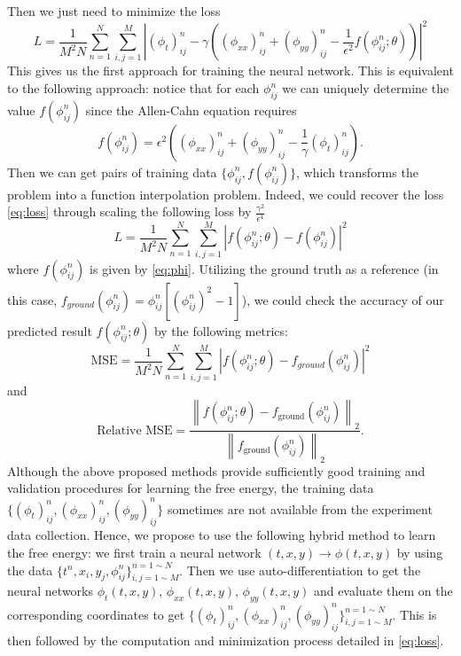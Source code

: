 Then we just need to minimize the loss 
\begin{equation}
    L = \frac{1}{M^{2}N} \sum^{N}_{n=1} \sum^{M}_{i, j=1} |(\phi_{t})^{n}_{ij} - \gamma ( (\phi_{xx})^{n}_{ij} + (\phi_{yy})^{n}_{ij} - \frac{1}{\epsilon^2} f( \phi^{n}_{ij};\theta ) )|^2
\label{eq:loss}
\end{equation}  
This gives us the first approach for training the neural network. This is equivalent to the following approach: notice that for each $\phi^{n}_{ij}$ we can uniquely determine the value $f( \phi^{n}_{ij} )$ since the Allen-Cahn equation requires
\begin{equation}
f( \phi^{n}_{ij} ) = \epsilon^2 ((\phi_{xx})^{n}_{ij} + (\phi_{yy})^{n}_{ij} - \frac{1}{\gamma} (\phi_t)^{n}_{ij} ).
\label{eq:phi}
\end{equation}
Then we can get pairs of training data $\{ \phi^{n}_{ij}, f( \phi^{n}_{ij} ) \}$, which transforms the problem into a function interpolation problem. Indeed, we could recover the loss \cref{eq:loss} through scaling the following loss by $\frac{\gamma^2}{\epsilon^4}$
\begin{equation}
    L = \frac{1}{M^{2}N} \sum^{N}_{n=1} \sum^{M}_{i, j=1} |f( \phi^{n}_{ij};\theta ) - f( \phi^{n}_{ij} )|^2
\label{eq:l}
\end{equation}
where $f( \phi^{n}_{ij} )$ is given by \eqref{eq:phi}. Utilizing the ground truth as a reference (in this case, \( f_{ground}( \phi^{n}_{ij} ) =  \phi^{n}_{ij} [(\phi^{n}_{ij})^{2} - 1] \)), we could check the accuracy of our predicted result $f( \phi^{n}_{ij};\theta )$ by the following metrics:
\begin{equation}
    \text{MSE} = \frac{1}{M^{2}N} \sum^{N}_{n=1} \sum^{M}_{i,j=1} |f( \phi^{n}_{ij};\theta ) - f_{ground}( \phi^{n}_{ij} )|^2
\label{eq:p}
\end{equation}
and
\begin{equation} \text{Relative MSE} = \frac{\left\| f\left( \phi^{n}_{ij};\theta \right) - f_{\text{ground}}\left( \phi^{n}_{ij} \right) \right\|_{2}}{\left\| f_{\text{ground}}\left( \phi^{n}_{ij} \right) \right\|_{2}}.
\label{eq:o}
\end{equation}
Although the above proposed methods provide sufficiently good training and validation procedures for learning the free energy, the training data $\{ (\phi_{t})^{n}_{ij}, (\phi_{xx})^{n}_{ij}, (\phi_{yy})^{n}_{ij} \}$ sometimes are not available from the experiment data collection. Hence, we propose to use the following hybrid method to learn the free energy: we first train a neural network $(t,x,y) \longrightarrow \phi(t,x,y)$ by using the data $\{ t^{n},x_{i},y_{j},\phi^{n}_{ij} \}^{n=1 \sim N}_{i,j=1 \sim M}$. Then we use auto-differentiation to get the neural networks $\phi_t (t,x,y)$, $\phi_{xx} (t,x,y)$, $\phi_{yy} (t,x,y)$ and evaluate them on the corresponding coordinates to get $\{ (\phi_{t})^{n}_{ij}, (\phi_{xx})^{n}_{ij}, (\phi_{yy})^{n}_{ij} \}^{n=1 \sim N}_{i,j=1 \sim M}$. This is then followed by the computation and minimization process detailed in \eqref{eq:loss}.

